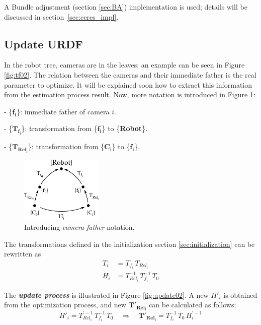 A Bundle adjustment (section \ref{sec:BA}) implementation is used; details will be discussed in section~\ref{sec:ceres_impl}.


\subsection{Update URDF}
\label{sec:update_urdf}

In the robot tree, cameras are in the leaves: an example can be seen in Figure \ref{fig:tf02}. The relation between the cameras and their immediate father is the real parameter to optimize. It will be explained soon how to extract this information from the estimation process result. Now, more notation is introduced in Figure \ref{fig:update01}:
\begin{itemize*}
 \item[-]  \{$\mathbf{f_i}$\}: immediate father of camera $i$.

 \item[-]  \{$\mathbf{T_{f_i}}$\}: transformation from \{$\mathbf{f_i}$\} to \{\textbf{Robot}\}.

 \item[-]  \{$\mathbf{T_{Rel_i}}$\}: transformation from \{$\mathbf{C_i}$\} to \{$\mathbf{f_i}$\}.

\end{itemize*}

\begin{figure}[!htbp]
 \centering
 \includegraphics[width=0.35\textwidth]{images/update01.pdf}
 \caption{Introducing \textit{camera father} notation.}
 \label{fig:update01}
\end{figure}

The transformations defined in the initialization section \ref{sec:initialization} can be rewritten as
\begin{align}
 T_i &= T_{f_i} \, T_{Rel_i} \\
 H_i &= T_{Rel_i}^{-1} \, T_{f_i}^{-1} \, T_0
\end{align}


The \textit{\textbf{update process}} is illustrated in Figure \ref{fig:update02}.
A new $H'_i$ is obtained from the optimization process, and new $\mathbf{T'_{Rel_i}}$ can be calculated as follows:
\begin{equation}
 H'_i = T_{Rel_i}^{' -1} \, T_{f_i}^{-1} \, T_0  \quad \Rightarrow \quad  \mathbf{T'_{Rel_i}} = T_{f_i}^{-1} \, T_0 \, H_{i}^{' -1}
\end{equation}

